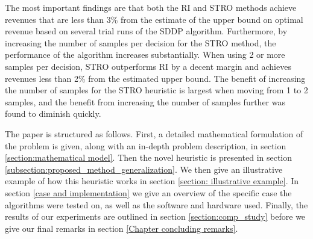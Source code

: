 The most important findings are that both the RI and STRO methods achieve revenues that are less than 3\% from the estimate of the upper bound on optimal revenue based on several trial runs of the SDDP algorithm. Furthermore, by increasing the number of samples per decision for the STRO method, the performance of the algorithm increases substantially. When using 2 or more samples per decision, STRO outperforms RI by a decent margin and achieves revenues less than 2\% from the estimated upper bound. The benefit of increasing the number of samples for the STRO heuristic is largest when moving from 1 to 2 samples, and the benefit from increasing the number of samples further was found to diminish quickly.

The paper is structured as follows. First, a detailed mathematical formulation of the problem is given, along with an in-depth problem description, in section \ref{section:mathematical model}. Then the novel heuristic is presented in section \ref{subsection:proposed_method_generalization}. We then give an illustrative example of how this heuristic works in section \ref{section: illustrative example}. In section \ref{case and implementation} we give an overview of the specific case the algorithms were tested on, as well as the software and hardware used. Finally, the results of our experiments are outlined in section \ref{section:comp_study} before we give our final remarks in section \ref{Chapter concluding remarks}.